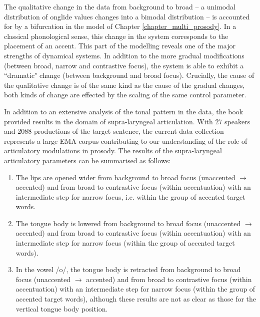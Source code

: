 The qualitative change in the data from background to broad -- a unimodal distribution of onglide values changes into a bimodal distribution -- is accounted for by a bifurcation in the model of Chapter \ref{chapter_multi_prosody}. In a classical phonological sense, this change in the system corresponds to the placement of an accent. This part of the modelling reveals one of the major strengths of dynamical systems. In addition to the more gradual modifications (between broad, narrow and contrastive focus), the system is able to exhibit a ``dramatic" change (between background and broad focus). Crucially, the cause of the qualitative change is of the same kind as the cause of the gradual changes, both kinds of change are effected by the scaling of the same control parameter.

In addition to an extensive analysis of the tonal pattern in the data, the book provided results in the domain of supra-laryngeal articulation. With 27 speakers and 2088 productions of the target sentence, the current data collection represents a large EMA corpus contributing to our understanding of the role of articulatory modulations in prosody. The results of the supra-laryngeal articulatory parameters can be summarised as follows:

\begin{enumerate}

\item The lips are opened wider from background to broad focus (unaccented $\rightarrow$ accented) and from broad to contrastive focus (within accentuation) with an intermediate step for narrow focus, i.e. within the group of accented target words.

\item The tongue body is lowered from background to broad focus (unaccented $\rightarrow$ accented) and from broad to contrastive focus (within accentuation) with an intermediate step for narrow focus (within the group of accented target words).

\item In the vowel /o/, the tongue body is retracted  from background to broad focus (unaccented $\rightarrow$ accented) and from broad to contrastive focus (within accentuation) with an intermediate step for narrow focus (within the group of accented target words), although these results are not as clear as those for the vertical tongue body position.

\end{enumerate}

